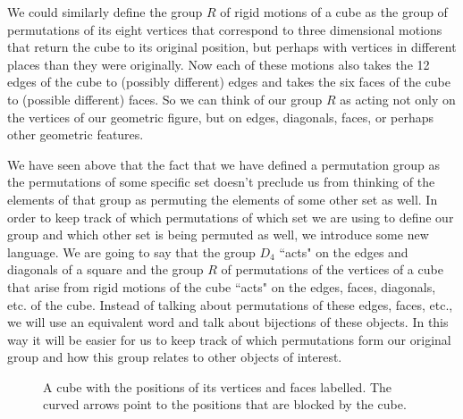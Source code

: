 We could similarly
define the  group $R$ of rigid motions of a cube as the group of
permutations of its eight vertices that correspond to three dimensional
motions that return the cube to its original position, but perhaps with
vertices in different places than they were originally.  Now each of
these motions also takes the 12 edges of the cube to (possibly different)
edges and takes the six faces of the cube to (possible different) faces. 
So we can think of our group $R$ as acting not only on the vertices of our
geometric figure, but on edges, diagonals, faces, or perhaps other
geometric features.  

We have seen above that the fact that we have defined a permutation group
as the permutations of some specific set doesn't preclude us from
thinking of the elements of that group as permuting the elements of some
other set as well.  In order to keep track of which permutations of which
set we are using to define our group and which other set is being
permuted as well, we introduce some new language.  We are going to say
that the group $D_4$ ``acts" on the edges and diagonals of  a square and
the group $R$   of permutations of the vertices of a cube
that arise from rigid motions of the cube ``acts" on the edges, faces,
 diagonals, etc. of the cube.  Instead of talking
about permutations of these edges, faces, etc., we will use an equivalent
word and talk about bijections of these objects.  In this way it will be
easier for us to keep track of which permutations form our original group
and how this group relates to other objects of interest. 

\begin{figure}[htb]\caption{A cube with the positions of its vertices and
faces labelled.  The curved arrows point to the positions that are blocked by
the cube.}
\label{cube1}\smallskip
\begin{center}\mbox{}
\end{center}  
\end{figure}

